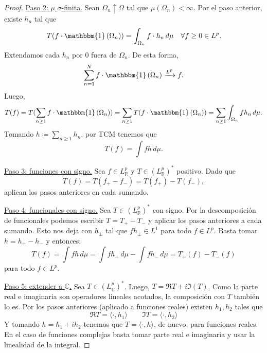 \documentclass{article}
\theoremstyle{plain}
\theoremstyle{definition}
\newcommand{\1}[1]{\mathbbm{1}\left( #1 \right)}
\newcommand{\C}{\mathbb{C}}
\newcommand{\R}{\mathbb{R}}
\begin{document}
\begin{proof}
  \underline{Paso 2: \(\mu\) \(\sigma\)-finita.}  
  Sean \(\Omega_n \uparrow \Omega\) tal que \(\mu(\Omega_n) < \infty\). Por el paso anterior,
  existe \(h_n\) tal que 
  \begin{displaymath}
    T(f \cdot \1{\Omega_n} ) 
    = \int_{\Omega_n} f \cdot h_n \, d\mu
    \quad
    \forall f\ge 0 \in L^p.
  \end{displaymath}
  Extendamos cada \(h_n\) por \(0\) fuera de \(\Omega_n\). De esta forma,
  \begin{displaymath}
    \sum_{n=1}^{N} f \cdot \1{\Omega_n} \xrightarrow{L^p} f.
  \end{displaymath}
  Luego,
  \begin{displaymath}
    T(f) 
    = T( \sum_{n\ge 1} f\cdot \1{\Omega_n})
    = \sum_{n\ge 1} T( f\cdot \1{\Omega_n} )
    = \sum_{n\ge 1} \int_{\Omega_n} f h_n \, d\mu.
  \end{displaymath}
  Tomando \(h \coloneqq \sum_{n\ge 1} h_n\), por TCM tenemos que
  \begin{displaymath}
    T(f) = \int f h \, d\mu.
  \end{displaymath}

  \underline{Paso 3: funciones con signo.}
  Sea \(f\in L_{\R}^p\) y \(T\in (L^{p}_{\R})^{\ast}\) positivo. Dado que
  \begin{displaymath}
    T(f) = T(f_{+} - f_{-}) = T(f_{+}) - T(f_{-}),
  \end{displaymath}
  aplican los pasos anteriores en cada sumando. 

  \underline{Paso 4: funcionales con signo.}
  Sea \(T\in(L^p_{\R})^{\ast}\) con signo. Por la descomposición de funcionales podemos
  escribir \(T = T_{+} - T_{-}\) y aplicar los pasos anteriores a cada sumando. Esto nos
  deja con \(h_{\pm}\) tal que \(fh_{\pm} \in L^1\) para todo \(f\in L^p\). Basta tomar
  \(h = h_{+}-h_{-}\) y entonces:
  \begin{displaymath}
    T(f) = \int fh \, d\mu = \int fh_{+}\, d\mu - \int fh_{-}\, d\mu = T_{+}(f) - T_{-}(f)
  \end{displaymath}
  para todo \(f\in L^p\). 

  \underline{Paso 5: extender a \(\C\).} Sea \(T\in(L^p_{\C})^{\ast}\).
  Luego, \(T = \Re{T} + i\Im(T)\). Como la parte real e imaginaria son operadores lineales acotados,
  la composición con \(T\) también lo es. Por los pasos anteriores (aplicado a funciones reales) 
  existen \(h_1, h_2\) tales que
  \begin{displaymath}
    \Re{T} = \langle \cdot, h_1 \rangle
    \qquad
    \Im{T} = \langle \cdot, h_2 \rangle
  \end{displaymath}
  Y tomando \(h = h_1 + i h_2\) tenemos que \(T = \langle \cdot, h \rangle\), de nuevo, para
  funciones reales. En el caso de funciones complejas basta tomar parte real e imaginaria y usar
  la linealidad de la integral.


\end{proof}
\end{document}

